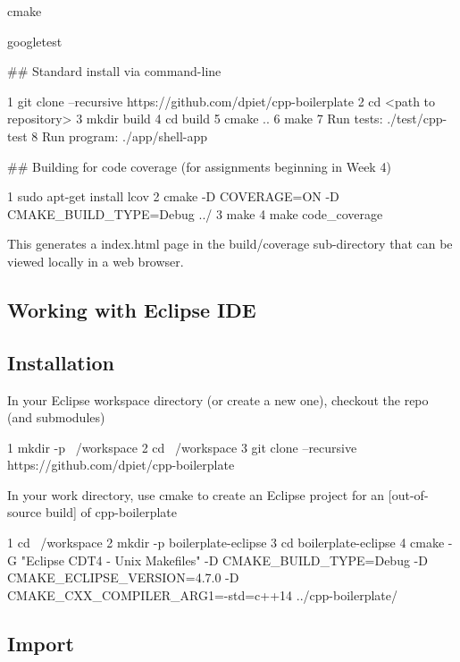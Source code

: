 \begin{DoxyItemize}
\item cmake
\item googletest
\end{DoxyItemize}

\#\# Standard install via command-\/line 
\begin{DoxyCode}
1 git clone --recursive https://github.com/dpiet/cpp-boilerplate
2 cd <path to repository>
3 mkdir build
4 cd build
5 cmake ..
6 make
7 Run tests: ./test/cpp-test
8 Run program: ./app/shell-app
\end{DoxyCode}


\#\# Building for code coverage (for assignments beginning in Week 4) 
\begin{DoxyCode}
1 sudo apt-get install lcov
2 cmake -D COVERAGE=ON -D CMAKE\_BUILD\_TYPE=Debug ../
3 make
4 make code\_coverage
\end{DoxyCode}
 This generates a index.\+html page in the build/coverage sub-\/directory that can be viewed locally in a web browser.

\subsection*{Working with Eclipse I\+DE}

\subsection*{Installation}

In your Eclipse workspace directory (or create a new one), checkout the repo (and submodules) 
\begin{DoxyCode}
1 mkdir -p ~/workspace
2 cd ~/workspace
3 git clone --recursive https://github.com/dpiet/cpp-boilerplate
\end{DoxyCode}


In your work directory, use cmake to create an Eclipse project for an \mbox{[}out-\/of-\/source build\mbox{]} of cpp-\/boilerplate


\begin{DoxyCode}
1 cd ~/workspace
2 mkdir -p boilerplate-eclipse
3 cd boilerplate-eclipse
4 cmake -G "Eclipse CDT4 - Unix Makefiles" -D CMAKE\_BUILD\_TYPE=Debug -D CMAKE\_ECLIPSE\_VERSION=4.7.0 -D
       CMAKE\_CXX\_COMPILER\_ARG1=-std=c++14 ../cpp-boilerplate/
\end{DoxyCode}


\subsection*{Import}

